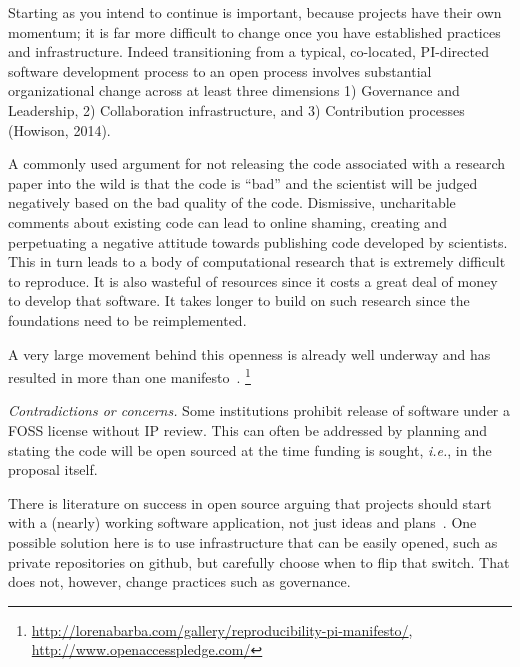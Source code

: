 \documentclass[a4paper,UKenglish]{dagman}
\newcommand{\ie}{\emph{i.e.},\xspace}
\begin{document}
Starting as you intend to continue is important, because projects have their own momentum; it is far more difficult to change once you have established practices and infrastructure. Indeed transitioning from a typical, co-located, PI-directed software development process to an open process involves substantial organizational change across at least three dimensions 1) Governance and Leadership, 2) Collaboration infrastructure, and 3) Contribution processes (Howison, 2014). 

A commonly used argument for not releasing the code associated with a research paper into the wild is that the code is ``bad'' and the scientist will be judged negatively based on the bad quality of the code.
Dismissive, uncharitable comments about existing code can lead to online shaming, creating and perpetuating a negative attitude towards publishing code developed by scientists.
This in turn leads to a body of computational research that is extremely difficult to reproduce. It is also wasteful of resources since it costs a great deal of money to develop that software. It takes longer to build on such research since the foundations need to be reimplemented.

A very large movement behind this openness is already well underway and has resulted in more than one manifesto~\cite{barba_reproducibility_2012,alex_holcombe_open_2011}.%
\footnote{\url{http://lorenabarba.com/gallery/reproducibility-pi-manifesto/}, \url{http://www.openaccesspledge.com/}}

\emph{Contradictions or concerns.}
Some institutions prohibit release of software under a FOSS license without IP review. This can often be addressed by planning and stating the code will be open sourced at the time funding is sought, \ie in the proposal itself.
 

There is literature on success in open source arguing that projects should start with a (nearly) working software application, not just ideas and plans~\cite{senyard2004have}. One possible solution here is to use infrastructure that can be easily opened, such as private repositories on github, but carefully choose when to flip that switch. That does not, however, change practices such as governance.
\end{document}
